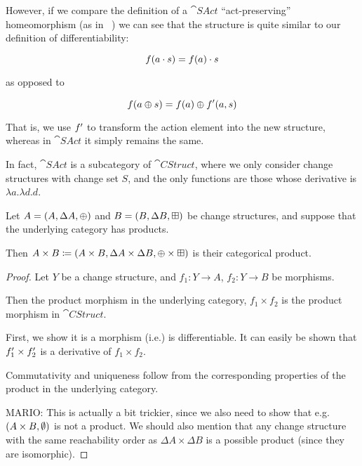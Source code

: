 However, if we compare the definition of a $\cat{SAct}$ ``act-preserving''
homeomorphism (as in ~\cite{kilp2000monoids}) we can see that the structure is quite similar to our definition
of differentiability:

$$f(a \cdot s) = f(a) \cdot s$$

as opposed to

$$f(a \oplus s) = f(a) \oplus f'(a, s)$$

That is, we use $f'$ to transform the action element into the new
structure, whereas in $\cat{SAct}$ it simply remains the same.

In fact, $\cat{SAct}$ is a subcategory of $\cat{CStruct}$, where we only
consider change structures with change set $S$, and the only functions are those
whose derivative is $\lambda a. \lambda d. d$.

\begin{prop}[Products]
  Let $A = (A,\Delta A,\oplus)$ and $B =
  (B,\Delta B,\boxplus)$ be change structures, and suppose that the
  underlying category has products.

  Then $A \times B \coloneqq (A \times B,\Delta A \times
  \Delta B,\oplus \times \boxplus)$ is their categorical product.
\end{prop}
\begin{proof}
  Let $Y$ be a change structure, and $f_1: Y \rightarrow A$, $f_2: Y
  \rightarrow B$ be morphisms.

  Then the product morphism in the underlying category, $f_1 \times f_2$ is the product
  morphism in $\cat{CStruct}$.

  First, we show it is a morphism (i.e.) is differentiable. It can easily be
  shown that $f_1' \times f_2'$ is a derivative of $f_1 \times f_2$.

  Commutativity and uniqueness follow from the corresponding properties of the
  product in the underlying category.

  MARIO: This is actually a bit trickier, since we also need to show that e.g. 
  $(A \times B, \emptyset)$ is not a product. We should also mention that any change
  structure with the same reachability order as $\Delta A \times \Delta B$ is a possible
  product (since they are isomorphic).
\end{proof}


